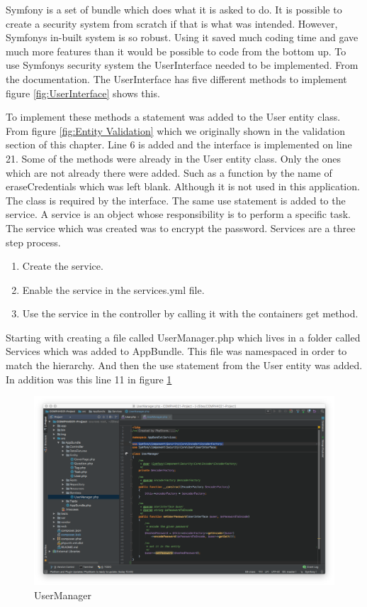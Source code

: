 Symfony is a set of bundle which does what it is asked to do. It is possible to create a security system from scratch if that is what was intended. However, Symfonys in-built system is so robust. Using it saved much coding time and gave much more features than it would be possible to code from the bottom up. To use Symfonys security system the UserInterface needed to be implemented. From the documentation. The UserInterface has five different methods to implement figure \ref{fig:UserInterface} shows this.

To implement these methods a statement was added to the User entity class. From figure \ref{fig:Entity Validation} which we originally shown in the validation section of this chapter. Line 6 is added and the interface is implemented on line 21. Some of the methods were already in the User entity class. Only the ones which are not already there were added. Such as a function by the name of eraseCredentials which was left blank. Although it is not used in this application. The class is required by the interface. The same use statement is added to the service. A service is an object whose responsibility is to perform a specific task. The service which was created was to encrypt the password. Services are a three step process.

\begin{enumerate}
  \item Create the service.
    \item Enable the service in the services.yml file.
      \item Use the service in the controller by calling it with the containers get method.
\end{enumerate}

Starting with creating a file called UserManager.php which lives in a folder called Services which was added to AppBundle. This file was namespaced in order to match the hierarchy. And then the use statement from the User entity was added. In addition was this line 11 in figure \ref{fig:UserManager}

\begin{figure}[htbp]
   \centering
   \includegraphics[width=400pt]{figures/user_manager.png} %
   \caption{UserManager}
   \label{fig:UserManager}
\end{figure}

